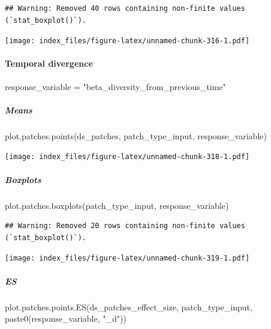 \documentclass[
]{article}
\newenvironment{Shaded}{\begin{snugshade}}{\end{snugshade}}
\newcommand{\FunctionTok}[1]{\textcolor[rgb]{0.00,0.00,0.00}{#1}}
\newcommand{\NormalTok}[1]{#1}
\newcommand{\OtherTok}[1]{\textcolor[rgb]{0.56,0.35,0.01}{#1}}
\newcommand{\StringTok}[1]{\textcolor[rgb]{0.31,0.60,0.02}{#1}}
\begin{document}
\begin{verbatim}
## Warning: Removed 40 rows containing non-finite values (`stat_boxplot()`).
\end{verbatim}

\texttt{[image: index\_files/figure-latex/unnamed-chunk-316-1.pdf]}

\hypertarget{temporal-divergence}{%
\paragraph{Temporal divergence}\label{temporal-divergence}}

\begin{Shaded}
\begin{Highlighting}[]
\NormalTok{response\_variable }\OtherTok{=} \StringTok{"beta\_diversity\_from\_previous\_time"}
\end{Highlighting}
\end{Shaded}

\hypertarget{means-23}{%
\subparagraph{Means}\label{means-23}}

\begin{Shaded}
\begin{Highlighting}[]
\FunctionTok{plot.patches.points}\NormalTok{(ds\_patches, patch\_type\_input,}
\NormalTok{                       response\_variable)}
\end{Highlighting}
\end{Shaded}

\texttt{[image: index\_files/figure-latex/unnamed-chunk-318-1.pdf]}

\hypertarget{boxplots-22}{%
\subparagraph{Boxplots}\label{boxplots-22}}

\begin{Shaded}
\begin{Highlighting}[]
\FunctionTok{plot.patches.boxplots}\NormalTok{(patch\_type\_input,}
\NormalTok{                       response\_variable)}
\end{Highlighting}
\end{Shaded}

\begin{verbatim}
## Warning: Removed 20 rows containing non-finite values (`stat_boxplot()`).
\end{verbatim}

\texttt{[image: index\_files/figure-latex/unnamed-chunk-319-1.pdf]}

\hypertarget{es-5}{%
\subparagraph{ES}\label{es-5}}

\begin{Shaded}
\begin{Highlighting}[]
\FunctionTok{plot.patches.points.ES}\NormalTok{(ds\_patches\_effect\_size, patch\_type\_input,}
                       \FunctionTok{paste0}\NormalTok{(response\_variable, }\StringTok{"\_d"}\NormalTok{))}
\end{Highlighting}
\end{Shaded}
\end{document}
